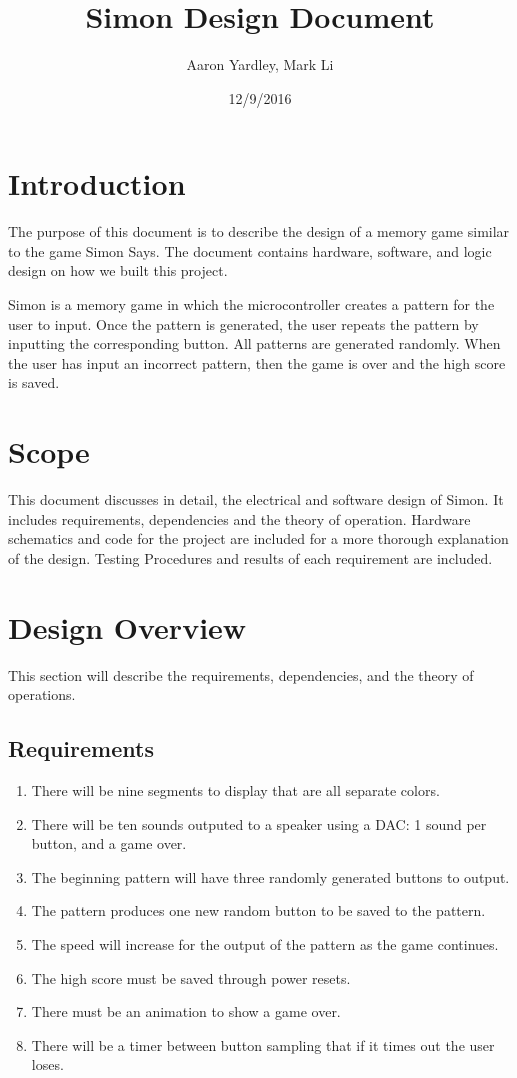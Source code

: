 \documentclass[draft]{article}
\title{Simon Design Document}
\author{ Aaron Yardley, Mark Li}
\date{12/9/2016}
\begin{document}
\sloppy
\maketitle
\newpage
\tableofcontents
\listoffigures
{}
\newpage
{}



\section{ Introduction}
\par
The purpose of this document is to describe the design of a memory game similar to the game Simon Says.  The document contains hardware, software, and logic design on how we built this project.
\par
\noindent
Simon is a memory game in which the microcontroller creates a pattern for the user to input. Once the pattern is generated, 
the user repeats the pattern by inputting the corresponding button.  All patterns are generated randomly.  When the user has input 
an incorrect pattern, then the game is over and the high score is saved.

\section{Scope}
\par
\noindent
This	document	discusses	in	detail,	the	electrical	and	software	design of Simon.	It	includes	requirements,	dependencies	and	the	theory	of	operation.	Hardware	
schematics	and	code	for	the	project	are	included	for	a	more	thorough	explanation	of	the	
design.	Testing	Procedures	and	results	of	each	requirement	are	included.		

\section{Design Overview}
This section will describe the requirements, dependencies, and the theory of operations.
\subsection{Requirements}
 \begin{enumerate}
   \item There will be nine segments to display that are all separate colors.
   \item There will be ten sounds outputed to a speaker using a DAC: 1 sound per button, and a game over.
   \item The beginning pattern will have three randomly generated buttons to output.
   \item The pattern produces one new random button to be saved to the pattern.
    \item The speed will increase for the output of the pattern as the game continues.
   \item The high score must be saved through power resets.
  \item There must be an animation to show a game over.
  \item There will be a timer between button sampling that if it times out the user loses.
  \end{enumerate}
\end{document}
